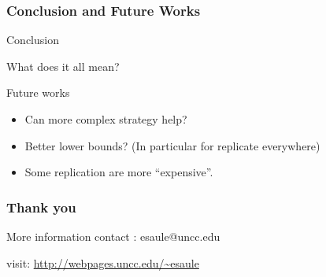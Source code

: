 \documentclass[usenames,dvipsnames]{beamer}
\begin{document}
\begin{frame}
  \frametitle{Conclusion and Future Works}

  \begin{block}{Conclusion}
    
    What does it all mean?
  \end{block}

  \begin{block}{Future works}
    \begin{itemize}
      \item Can more complex strategy help?
      \item Better lower bounds? (In particular for replicate everywhere)
      \item Some replication are more ``expensive''.
    \end{itemize}
  \end{block}
\end{frame}



\begin{frame}
  \frametitle{Thank you}

    \begin{block}{More information}
    contact : esaule@uncc.edu
    
    visit: \url{http://webpages.uncc.edu/~esaule}
  \end{block}

\end{frame}
\end{document}
